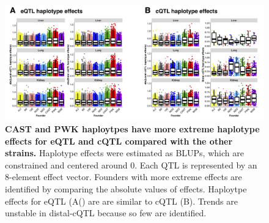 \documentclass[10pt,letterpaper,twoside]{article}
\begin{document}
\begin{figure}[hp]
\renewcommand{\familydefault}{\sfdefault}\normalfont
\centering
\includegraphics[width=\textwidth, trim={0in 0in 0in 0in}, clip]{figs/all_qtl_effects_abs.png}
\caption{\textbf{CAST and PWK haploytpes have more extreme haplotype effects for eQTL and cQTL compared with the other strains.} 
Haplotype effects were estimated as BLUPs, which are constrained and centered around 0. Each QTL is represented by an 8-element effect vector. Founders with more extreme effects are identified by comparing the absolute values of effects. Haploytpe effects for eQTL (A() are are similar to cQTL (B). Trends are unstable in distal-cQTL because so few are identified.
\label{fig:qtl_effects_abs}}
\end{figure}

\clearpage
\end{document}
